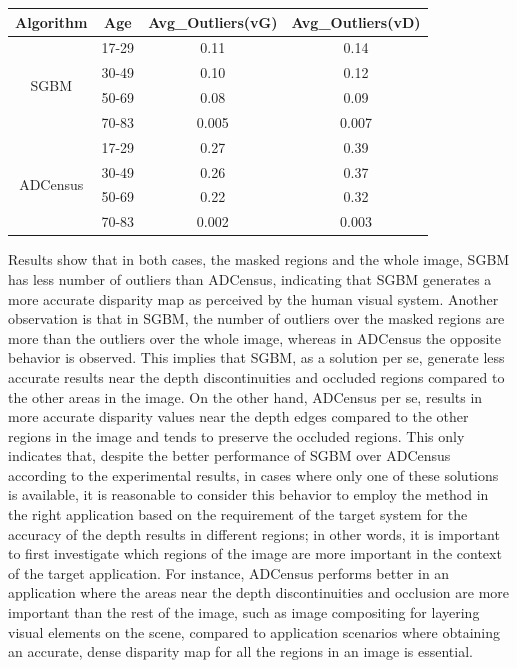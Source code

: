 \begin{minipage}{0.8\linewidth}
\begin{center}
\label{tab:outlfull}
\begin{tabular}{ |c|c|c|c| }
\hline
Algorithm & Age & Avg\_Outliers(vG) & Avg\_Outliers(vD)  \\ \hline
\multirow{4}{*}{SGBM} & 17-29 & 0.11 & 0.14 \\
& 30-49 & 0.10 & 0.12 \\
& 50-69 & 0.08 & 0.09 \\
& 70-83 & 0.005 & 0.007 \\ \hline
\multirow{4}{*}{ADCensus} & 17-29 & 0.27 & 0.39 \\
& 30-49 & 0.26 & 0.37 \\
& 50-69 & 0.22 & 0.32 \\
& 70-83 & 0.002 & 0.003 \\ \hline
\end{tabular}
\end{center}
\end{minipage} \newline

Results show that in both cases, the masked regions and the whole image, SGBM has less number of outliers than ADCensus, indicating that
SGBM generates a more accurate disparity map as perceived by the human visual system.
Another observation is that in SGBM, the number of outliers over the masked regions are more than the outliers over the whole image, whereas in ADCensus the
opposite behavior is observed. This implies that SGBM, as a solution per se, generate less accurate results
near the depth discontinuities and occluded regions compared to the other areas in the image.
On the other hand, ADCensus per se, results in more accurate disparity values near the depth edges compared to the other regions in the image and 
tends to preserve the occluded regions. This only indicates that, despite the better performance of SGBM over ADCensus according to the
experimental results, in cases where only one of these solutions is available, it is reasonable to consider this behavior to employ the method
in the right application based on the requirement of the target system for the accuracy of the depth results in different regions; in other
words, it is important to first investigate which regions of the image are more important in the context of the target application.
For instance, ADCensus performs better in an application where the areas
near the depth discontinuities and occlusion are more important than the rest of the image, such as image compositing for layering visual elements
on the scene, compared to application scenarios where obtaining an accurate, dense disparity map for all the regions in an image is essential.

